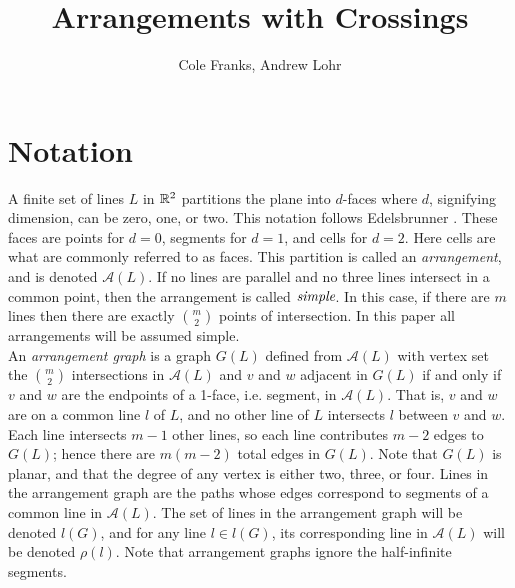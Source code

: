 \documentclass[11pt, oneside]{article}
\title{Arrangements with Crossings}
\author{Cole Franks, Andrew Lohr}
\begin{document}
\maketitle

\section{Notation}

A finite set of lines $L$ in $\mathbb{R}^2$ partitions the plane into $d$-faces where $d$, signifying dimension, can be zero, one, or two. This notation follows Edelsbrunner \cite{edels}. These faces are points for $d=0$, segments for $d = 1$, and cells for $d=2$. Here cells are what are commonly referred to as faces. This partition is called an \emph{arrangement}, and is denoted $\mathcal{A}(L)$. If no lines are parallel and no three lines intersect in a common point, then the arrangement is called $\emph{simple}$. In this case, if there are $m$ lines then there are exactly ${m \choose 2}$ points of intersection. In this paper all arrangements will be assumed simple.\\

An \emph{arrangement graph} is a graph $G(L)$ defined from $\mathcal{A}(L)$ with vertex set the ${m \choose 2}$ intersections in $\mathcal{A}(L)$ and $v$ and $w$ adjacent in $G(L)$ if and only if $v$ and $w$ are the endpoints of a 1-face, i.e. segment, in $\mathcal{A}(L)$. That is, $v$ and $w$ are on a common line $l$ of $L$, and no other line of $L$ intersects $l$ between $v$ and $w$. Each line intersects $m-1$ other lines, so each line contributes $m-2$ edges to $G(L)$; hence there are $m(m-2)$ total edges in $G(L)$. Note that $G(L)$ is planar, and that the degree of any vertex is either two, three, or four. Lines in the arrangement graph are the paths whose edges correspond to segments of a common line in $\mathcal{A}(L)$. The set of lines in the arrangement graph will be denoted $l(G)$, and for any line $l \in l(G)$, its corresponding line in $\mathcal{A}(L)$ will be denoted $\rho(l)$. Note that arrangement graphs ignore the half-infinite segments.\\
\end{document}

